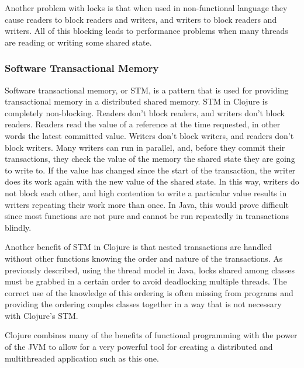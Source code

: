 Another problem with locks is that when used in non-functional language they cause 
readers to block readers and writers, and writers to block readers and writers. All of this blocking leads to performance problems
when many threads are reading or writing some shared state.

\subsubsection{Software Transactional Memory}
Software transactional memory, or STM, is a pattern that is used for providing transactional memory in a distributed shared memory\cite{stm}. STM in Clojure is completely non-blocking. Readers don't block readers, and writers don't block readers. Readers read the value of a reference at the time requested, in other words the latest committed value. Writers don't block writers, and readers don't block writers. Many writers can run in parallel, and, before they commit their transactions, they check the value of the memory the shared state they are going to write to. If the value has changed since the start of the transaction, the writer does its work again with the new value of the shared state. In this way, writers do not block each other, and high contention to write a particular value results in writers repeating their work more than once. In Java, this would prove difficult since most functions are not pure and cannot be run repeatedly in transactions blindly. 

Another benefit of STM in Clojure is that nested transactions are handled without other functions knowing the order and nature of the transactions. As previously described, using the thread model in Java, locks shared among classes must be grabbed in a certain order to avoid deadlocking multiple threads. The correct use of the knowledge of this ordering is often missing from programs and providing the ordering couples classes together in a way that is not necessary with Clojure's STM.  

Clojure combines many of the benefits of functional programming with the power of the JVM to allow for a very powerful tool for creating a distributed and multithreaded application such as this one.  





